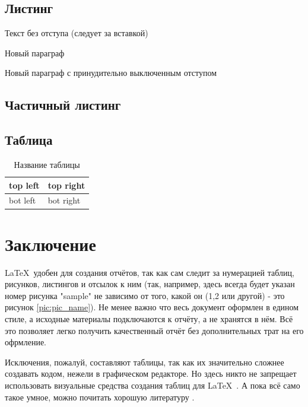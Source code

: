 \subsection{Листинг}


\parindent=1cm %
Текст без отступа (следует за вставкой)

Новый параграф

\noindent Новый параграф с принудительно выключенным отступом


\subsection{Частичный листинг}
\makeatletter
\def\lst@PlaceNumber{\llap{\normalfont
                \lst@numberstyle{\the\lst@lineno}\kern\lst@numbersep}}
\makeatother


\parindent=1cm

\subsection{Таблица}

\begin{table}[H]
	\caption{Название таблицы}
	\begin{center}
		\begin{tabular}{|l|l|}
			\hline
			top left & top right\\ \hline
			bot left & bot right\\ \hline
	\end{tabular}
		\label{tabular:tab_examp}
	\end{center}
\end{table}

\section*{Заключение}
\LaTeX\ удобен для создания отчётов, так как сам следит за нумерацией таблиц, рисунков, листингов и отсылок к ним (так, например, здесь всегда будет указан номер рисунка "sample" не зависимо от того, какой он (1,2 или другой) - это рисунок \ref{pic:pic_name}). Не менее важно что весь документ оформлен в едином стиле, а исходные материалы подключаются к отчёту, а не хранятся в нём. Всё это позволяет легко получить качественный отчёт без дополнительных трат на его офрмление.

Исключения, пожалуй, составляют таблицы, так как их значительно сложнее создавать кодом, нежели в графическом редакторе. Но здесь никто не запрещает использовать визуальные средства создания таблиц для \LaTeX\ . А пока всё само такое умное, можно почитать хорошую литературу \cite{saturday_is_monday}.


\renewcommand\refname{Список использованных источников}



